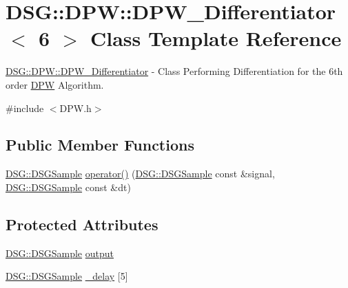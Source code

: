 \hypertarget{class_d_s_g_1_1_d_p_w_1_1_d_p_w___differentiator_3_016_01_4}{\section{D\+S\+G\+:\+:D\+P\+W\+:\+:D\+P\+W\+\_\+\+Differentiator$<$ 6 $>$ Class Template Reference}
\label{class_d_s_g_1_1_d_p_w_1_1_d_p_w___differentiator_3_016_01_4}
}


\hyperlink{class_d_s_g_1_1_d_p_w_1_1_d_p_w___differentiator}{D\+S\+G\+::\+D\+P\+W\+::\+D\+P\+W\+\_\+\+Differentiator} -\/ Class Performing Differentiation for the 6th order \hyperlink{namespace_d_s_g_1_1_d_p_w}{D\+P\+W} Algorithm.  




{\ttfamily \#include $<$D\+P\+W.\+h$>$}

\subsection*{Public Member Functions}
\begin{DoxyCompactItemize}
\item 
\hyperlink{namespace_d_s_g_ac39a94cd27ebcd9c1e7502d0c624894a}{D\+S\+G\+::\+D\+S\+G\+Sample} \hyperlink{class_d_s_g_1_1_d_p_w_1_1_d_p_w___differentiator_3_016_01_4_a82356846abaeef0ed76e9803a7863f3c}{operator()} (\hyperlink{namespace_d_s_g_ac39a94cd27ebcd9c1e7502d0c624894a}{D\+S\+G\+::\+D\+S\+G\+Sample} const \&signal, \hyperlink{namespace_d_s_g_ac39a94cd27ebcd9c1e7502d0c624894a}{D\+S\+G\+::\+D\+S\+G\+Sample} const \&dt)
\end{DoxyCompactItemize}
\subsection*{Protected Attributes}
\begin{DoxyCompactItemize}
\item 
\hyperlink{namespace_d_s_g_ac39a94cd27ebcd9c1e7502d0c624894a}{D\+S\+G\+::\+D\+S\+G\+Sample} \hyperlink{class_d_s_g_1_1_d_p_w_1_1_d_p_w___differentiator_3_016_01_4_a6939d53801d66571b5935bcd5561548a}{output}
\item 
\hyperlink{namespace_d_s_g_ac39a94cd27ebcd9c1e7502d0c624894a}{D\+S\+G\+::\+D\+S\+G\+Sample} \hyperlink{class_d_s_g_1_1_d_p_w_1_1_d_p_w___differentiator_3_016_01_4_a8f3e45aa44791b711f6e71aff92505ca}{\+\_\+delay} \mbox{[}5\mbox{]}
\end{DoxyCompactItemize}


